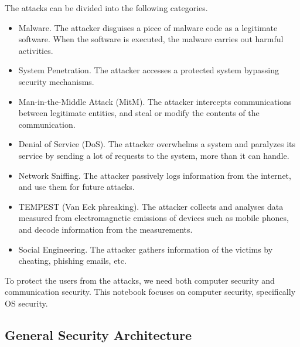 The attacks can be divided into the following categories.
\begin{itemize}
	\item Malware. The attacker disguises a piece of malware code as a legitimate software. When the software is executed, the malware carries out harmful activities.
	\item System Penetration. The attacker accesses a protected system bypassing security mechanisms.
	\item Man-in-the-Middle Attack (MitM). The attacker intercepts communications between legitimate entities, and steal or modify the contents of the communication.
	\item Denial of Service (DoS). The attacker overwhelms a system and paralyzes its service by sending a lot of requests to the system, more than it can handle.
	\item Network Sniffing. The attacker passively logs information from the internet, and use them for future attacks.
	\item TEMPEST (Van Eck phreaking). The attacker collects and analyses data measured from electromagnetic emissions of devices such as mobile phones, and decode information from the measurements.
	\item Social Engineering. The attacker gathers information of the victims by cheating, phishing emails, etc.
\end{itemize}

To protect the users from the attacks, we need both computer security and communication security. This notebook focuses on computer security, specifically OS security.

\subsection{General Security Architecture}

